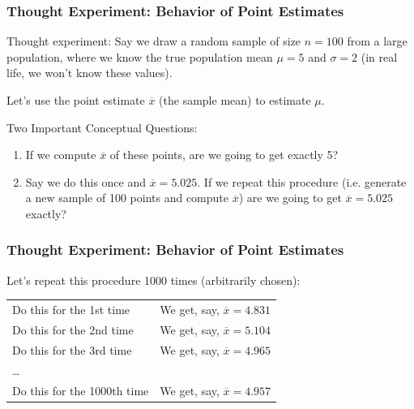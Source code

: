 \documentclass[handout]{beamer}
\newcommand{\blue}[1]{\textcolor{blue2}{#1}}
\newcommand{\xbar}{\overline{x}}
\begin{document}
\begin{frame}[fragile]
\frametitle{Thought Experiment: Behavior of Point Estimates}
\blue{Thought experiment}: Say we draw a random sample of size $n=100$ from a large population, where \blue{we know} the true population mean $\mu=5$ and $\sigma=2$ (in real life, we won't know these values).  

\vskip 0.5cm 

\pause Let's use the \blue{point estimate} $\xbar$ (the sample mean) to estimate $\mu$.  

\vskip 0.5cm

\pause \blue{Two Important Conceptual Questions}:
\begin{enumerate}
\pause \item If we compute $\overline{x}$ of these points, are we going to get exactly 5?
\pause \item Say we do this once and $\overline{x}=5.025$.  If we repeat this procedure (i.e. generate a \blue{new} sample of 100 points and compute $\overline{x}$) are we going to get $\overline{x} = 5.025$ exactly?
\end{enumerate}

\end{frame}


\begin{frame}
\frametitle{Thought Experiment: Behavior of Point Estimates}
Let's repeat this procedure 1000 times (arbitrarily chosen):

\begin{center}
\begin{tabular}{ll}
\pause Do this for the 1st time & We get, say, $\overline{x}=4.831$\\
\pause Do this for the 2nd time & We get, say, $\overline{x}=5.104$\\
\pause Do this for the 3rd time & We get, say, $\overline{x}=4.965$\\
\pause \ldots & \\
\pause Do this for the 1000th time & We get, say, $\overline{x}=4.957$\\
\end{tabular}
\end{center}

\end{frame}
\end{document}
